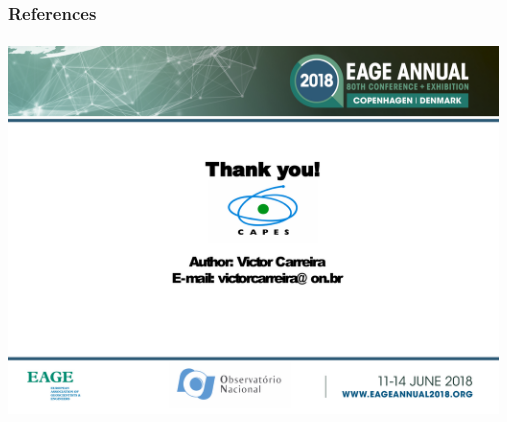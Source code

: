 \documentclass[aspectratio=10]{beamer} %
\begin{document}

\begin{frame}[allowframebreaks]
\frametitle{References}
\tiny


\end{frame}

\begin{frame}
\flushbottom
\setlength{\parskip}{-1ex plus 1ex }
\setlength{\parindent}{-15pt}
\includegraphics[width=13cm,height=10cm]{Imagens/end.pdf}
\end{frame}
\end{document}
